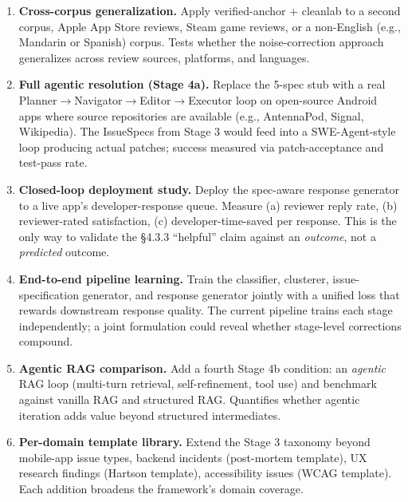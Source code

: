 \documentclass[sigconf, nonacm, anonymous, balance=false]{acmart}
\begin{document}
\begin{enumerate}
\def\labelenumi{\arabic{enumi}.}
\setcounter{enumi}{7}
\item
  \textbf{Cross-corpus generalization.} Apply verified-anchor + cleanlab to a second corpus, Apple App Store reviews, Steam game reviews, or a non-English (e.g., Mandarin or Spanish) corpus. Tests whether the noise-correction approach generalizes across review sources, platforms, and languages.
\item
  \textbf{Full agentic resolution (Stage 4a).} Replace the 5-spec stub with a real Planner$\rightarrow$Navigator$\rightarrow$Editor$\rightarrow$Executor loop on open-source Android apps where source repositories are available (e.g., AntennaPod, Signal, Wikipedia). The IssueSpecs from Stage 3 would feed into a SWE-Agent-style loop \cite{nashid2023codequery, ahmed2024automatic} producing actual patches; success measured via patch-acceptance and test-pass rate.
\item
  \textbf{Closed-loop deployment study.} Deploy the spec-aware response generator to a live app's developer-response queue. Measure (a) reviewer reply rate, (b) reviewer-rated satisfaction, (c) developer-time-saved per response. This is the only way to validate the \S4.3.3 ``helpful'' claim against an \emph{outcome}, not a \emph{predicted} outcome.
\item
  \textbf{End-to-end pipeline learning.} Train the classifier, clusterer, issue-specification generator, and response generator jointly with a unified loss that rewards downstream response quality. The current pipeline trains each stage independently; a joint formulation could reveal whether stage-level corrections compound.
\item
  \textbf{Agentic RAG comparison.} Add a fourth Stage 4b condition: an \emph{agentic} RAG loop (multi-turn retrieval, self-refinement, tool use) and benchmark against vanilla RAG and structured RAG. Quantifies whether agentic iteration adds value beyond structured intermediates.
\item
  \textbf{Per-domain template library.} Extend the Stage 3 taxonomy beyond mobile-app issue types, backend incidents (post-mortem template), UX research findings (Hartson template), accessibility issues (WCAG template). Each addition broadens the framework's domain coverage.
\end{enumerate}



\end{document}
